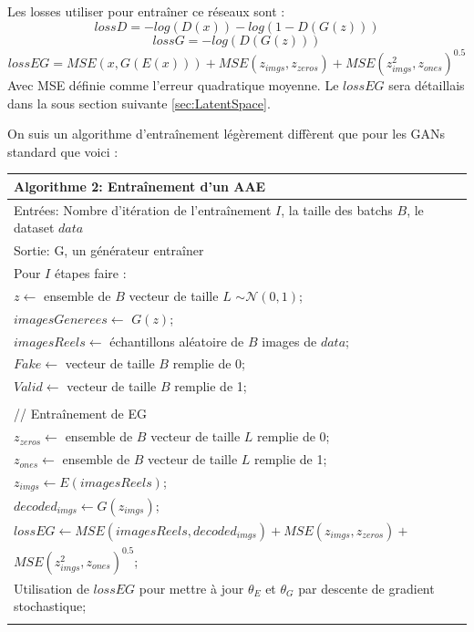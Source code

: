 \documentclass[11pt,francais]{article}
\begin{document}
Les losses utiliser pour entraîner ce réseaux sont :
\[
lossD = -log(D(x)) - log(1-D(G(z)))
\]
\[
lossG = -log(D(G(z)))
\]
\[
lossEG = MSE(x, G(E(x))) + MSE(z_{imgs}, z_{zeros}) + MSE(z_{imgs}^2, z_{ones})^{0.5}
\]
Avec MSE définie comme l'erreur quadratique moyenne.
Le \(lossEG\) sera détaillais dans la sous section suivante \ref{sec:LatentSpace}.

On suis un algorithme d'entraînement légèrement diffèrent que pour les GANs standard que voici :
\begin{table}[hb]
  \begin{tabular}{l}
  \hline
  Algorithme 2: Entraînement d'un AAE\tabularnewline
  \hline
  Entrées: Nombre d'itération de l'entraînement  \(I\), la taille des batchs \(B\), le dataset \(data\)  \tabularnewline
  Sortie: G, un générateur entraîner \tabularnewline
  \hline
  Pour \(I\) étapes faire :\tabularnewline 
  \hspace{1cm}\(z \leftarrow\) ensemble de \(B\) vecteur de taille \(L\) \(\sim \mathcal{N}(0,1)\);\tabularnewline
  \hspace{1cm}\(imagesGenerees \leftarrow\) \(G(z)\);\tabularnewline  
  \hspace{1cm}\(imagesReels \leftarrow\) échantillons aléatoire de \(B\) images de \(data\);\tabularnewline
  \hspace{1cm}\(Fake \leftarrow\) vecteur de taille \(B\) remplie de 0;\tabularnewline
  \hspace{1cm}\(Valid \leftarrow\) vecteur de taille \(B\) remplie de 1;\tabularnewline
  \tabularnewline
  
  \hspace{1cm}// Entraînement de EG\tabularnewline
  \hspace{1cm}\(z_{zeros} \leftarrow\) ensemble de \(B\) vecteur de taille \(L\) remplie de 0;\tabularnewline
  \hspace{1cm}\(z_{ones} \leftarrow\) ensemble de \(B\) vecteur de taille \(L\) remplie de 1;\tabularnewline
  \hspace{1cm}\(z_{imgs} \leftarrow E(imagesReels)\);\tabularnewline
  \hspace{1cm}\(decoded_{imgs} \leftarrow G(z_{imgs})\);\tabularnewline
  \hspace{1cm}\(lossEG \leftarrow MSE(imagesReels, decoded_{imgs}) + MSE(z_{imgs}, z_{zeros}) +\)\tabularnewline
  \hspace{2,8cm}\(MSE(z_{imgs}^2, z_{ones})^{0.5}\);\tabularnewline
  \hspace{1cm}Utilisation de \(lossEG\) pour mettre à jour \(\theta_E\) et \(\theta_G\) par descente de gradient stochastique;\tabularnewline
  \tabularnewline
  

\end{tabular}
\end{table}
\end{document}
